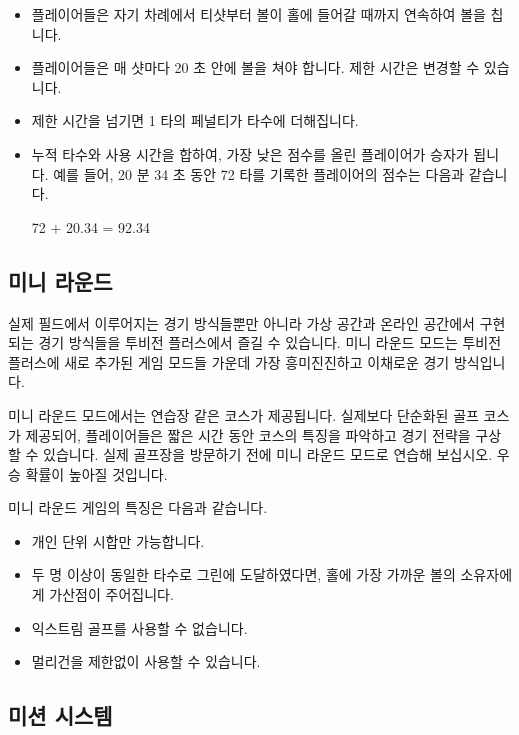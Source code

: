 \documentclass[10pt, openright, language=korean]{hzguide}
\begin{document}
\begin{itemize}
\item 플레이어들은 자기 차례에서 티샷부터 볼이 홀에 들어갈 때까지 연속하여 볼을 칩니다.
\item 플레이어들은 매 샷마다 20 초 안에 볼을 쳐야 합니다. 제한 시간은 변경할 수 있습니다.
\item 제한 시간을 넘기면 1 타의 페널티가 타수에 더해집니다.
\item 누적 타수와 사용 시간을 합하여, 가장 낮은 점수를 올린 플레이어가 승자가 됩니다.
예를 들어, 20 분 34 초 동안 72 타를 기록한 플레이어의 점수는 다음과 같습니다.
\begin{reference}
72 + 20.34 = 92.34
\end{reference}
\end{itemize}

\subsection{미니 라운드}

실제 필드에서 이루어지는 경기 방식들뿐만 아니라 가상 공간과 온라인 공간에서 구현되는 경기 방식들을 투비전 플러스에서 즐길 수 있습니다. 미니 라운드 모드는 투비전 플러스에 새로 추가된 게임 모드들 가운데 가장 흥미진진하고 이채로운 경기 방식입니다.


미니 라운드 모드에서는 연습장 같은 코스가 제공됩니다. 실제보다 단순화된 골프 코스가 제공되어, 플레이어들은 짧은 시간 동안 코스의 특징을 파악하고 경기 전략을 구상할 수 있습니다. 실제 골프장을 방문하기 전에 미니 라운드 모드로 연습해 보십시오. 우승 확률이 높아질 것입니다.

미니 라운드 게임의 특징은 다음과 같습니다.

\begin{itemize}
\item 개인 단위 시합만 가능합니다.
\item 두 명 이상이 동일한 타수로 그린에 도달하였다면, 홀에 가장 가까운 볼의 소유자에게 가산점이 주어집니다.
\item 익스트림 골프를 사용할 수 없습니다.
\item 멀리건을 제한없이 사용할 수 있습니다.
\end{itemize}

\subsection{미션 시스템}

\end{document}
